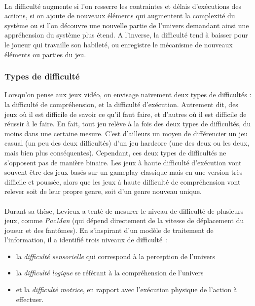 \paragraph{}La difficulté augmente si l’on resserre les contraintes et délais d’exécutions des actions, si on ajoute de nouveaux éléments qui augmentent la complexité du système ou si l’on découvre une nouvelle partie de l’univers demandant ainsi une appréhension du système plus étend. A l’inverse, la difficulté tend à baisser pour le joueur qui travaille son habileté, ou enregistre le mécanisme de nouveaux éléments ou parties du jeu.

		\subsubsection{Types de difficulté}
Lorsqu'on pense aux jeux vidéo, on envisage naïvement deux types de difficultés : la difficulté de compréhension, et la difficulté d’exécution. Autrement dit, des jeux où il est difficile de savoir ce qu’il faut faire, et d’autres où il est difficile de réussir à le faire. En fait, tout jeu relève à la fois des deux types de difficultés, du moins dans une certaine mesure. C’est d’ailleurs un moyen de différencier un jeu \gls{casual} (un peu des deux difficultés) d’un jeu \gls{hardcore} (une des deux ou les deux, mais bien plus conséquentes). Cependant, ces deux types de difficultés ne s’opposent pas de manière binaire. Les jeux à haute difficulté d’exécution vont souvent être des jeux basés sur un gameplay classique mais en une version très difficile et poussée, alors que les jeux à haute difficulté de compréhension vont relever soit de leur propre genre, soit d’un genre nouveau unique.

\paragraph{}
Durant sa thèse, Levieux\cite{Levi11} a tenté de mesurer le niveau de difficulté de plusieurs jeux, comme \emph{PacMan} (qui dépend directement de la vitesse de déplacement du joueur et des fantômes). En s’inspirant d’un modèle de traitement de l’information, il a identifié trois niveaux de difficulté~:
	\begin{itemize}
		\item la \emph{difficulté sensorielle} qui correspond à la perception de l’univers
		\item la \emph{difficulté logique} se référant à la compréhension de l’univers
		\item et la \emph{difficulté motrice}, en rapport avec l'exécution physique de l’action à effectuer.
\end{itemize}

